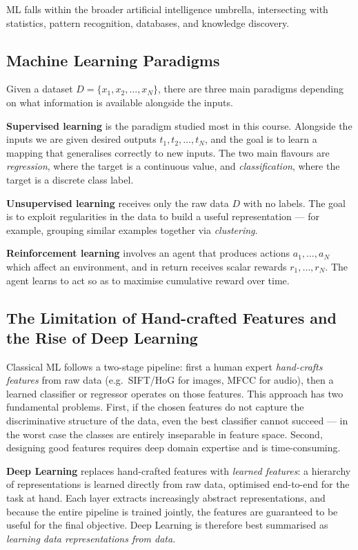 \documentclass[11pt,a4paper]{article}
\newcommand{\term}[1]{\textcolor{DefGreen}{\textbf{#1}}}
\begin{document}
ML falls within the broader artificial intelligence umbrella, intersecting with statistics, pattern recognition, databases, and knowledge discovery.

\subsection{Machine Learning Paradigms}

Given a dataset $D = \{x_1, x_2, \ldots, x_N\}$, there are three main paradigms depending on what information is available alongside the inputs.

\term{Supervised learning} is the paradigm studied most in this course. Alongside the inputs we are given desired outputs $t_1, t_2, \ldots, t_N$, and the goal is to learn a mapping that generalises correctly to new inputs. The two main flavours are \emph{regression}, where the target is a continuous value, and \emph{classification}, where the target is a discrete class label.

\term{Unsupervised learning} receives only the raw data $D$ with no labels. The goal is to exploit regularities in the data to build a useful representation — for example, grouping similar examples together via \emph{clustering}.

\term{Reinforcement learning} involves an agent that produces actions $a_1, \ldots, a_N$ which affect an environment, and in return receives scalar rewards $r_1, \ldots, r_N$. The agent learns to act so as to maximise cumulative reward over time.

\subsection{The Limitation of Hand-crafted Features and the Rise of Deep Learning}

Classical ML follows a two-stage pipeline: first a human expert \emph{hand-crafts features} from raw data (e.g.\ SIFT/HoG for images, MFCC for audio), then a learned classifier or regressor operates on those features. This approach has two fundamental problems. First, if the chosen features do not capture the discriminative structure of the data, even the best classifier cannot succeed — in the worst case the classes are entirely inseparable in feature space. Second, designing good features requires deep domain expertise and is time-consuming.

\term{Deep Learning} replaces hand-crafted features with \emph{learned features}: a hierarchy of representations is learned directly from raw data, optimised end-to-end for the task at hand. Each layer extracts increasingly abstract representations, and because the entire pipeline is trained jointly, the features are guaranteed to be useful for the final objective. Deep Learning is therefore best summarised as \emph{learning data representations from data}.
\end{document}
